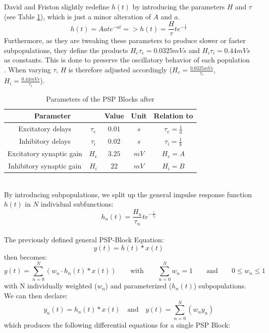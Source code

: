 David and Friston slightly redefine $h(t)$ by introducing the parameters $H$ and $\tau$ (see Table \ref{tab:davidfriston}), which is just a minor alteration of $A$ and $a$.
\[ h(t)=Aate^{-at} => h(t)=\frac{H}{\tau}te^{-\frac{1}{\tau}} \]
Furthermore, as they are tweaking these parameters to produce slower or faster subpopulations, they define the products $H_e\tau_e=0.0325mVs$ and $H_i\tau_i=0.44mVs$ as constants. This is done to preserve the oscillatory behavior of each population \parencite{david_neural_2003}. When varying $\tau$, $H$ is therefore adjusted accordingly ($H_e=\frac{0.0325mVs}{\tau_e}$, $H_i=\frac{0.44mVs}{\tau_i}$).
\begin{table}[H]
    \centering
    \begin{tabular}{ |c|c|c|c|c| }
        \hline
        \multicolumn{2}{|c|}{Parameter} & Value & Unit & Relation to \parencite{jansen_electroencephalogram_1995} \\
        \hline
        \hline
        \rule{0pt}{3ex}Excitatory delays        & \(\tau_e\) & \(0.01\) & $s$  & $ \tau_e = \frac{1}{a} $ \\[1.2ex]
        \hline
        \rule{0pt}{3ex}Inhibitory delays        & \(\tau_i\) & \(0.02\) & $s$  & $ \tau_i = \frac{1}{b} $\\[1.2ex]
        \hline
        \rule{0pt}{3ex}Excitatory synaptic gain & \(H_e\)    & \(3.25\) & $mV$ & $ H_e = A $ \\[1.2ex]
        \hline
        \rule{0pt}{3ex}Inhibitory synaptic gain & \(H_i\)    & \(22\)   & $mV$ & $ H_i = B $ \\[1.2ex]
        \hline
    \end{tabular}
    \caption{Parameters of the PSP Blocks after \parencite{david_neural_2003}}
    \label{tab:davidfriston}
\end{table}
 \\[2em]
By introducing subpopulations, we split up the general impulse response function $h(t)$ in $N$ individual subfunctions:
\[h_n(t) = \frac{H_n}{\tau_n}te^{-\frac{1}{\tau_n}}\] \\[1em]

The previously defined general PSP-Block Equation:
\[y(t)=h(t)\ast x(t)\]
then becomes:
\[y(t)=\sum_{n=0}^{N}{(w_n \cdot h_n(t) \ast x(t))} \hspace{2em}\text{with}\hspace{2em} \sum_{n=0}^{N}w_n = 1 \hspace{2em}\text{and}\hspace{2em} 0 \leq w_n \leq 1\]
with N individually weighted ($w_n$) and parameterized ($h_n(t)$) subpopulations. \\
We can then declare:
\[y_n(t) = h_n(t) \ast x(t) \quad \text{and} \quad y(t) = \sum_{n=0}^{N} (w_ny_n)\]
which produces the following differential equations for a single PSP Block:

